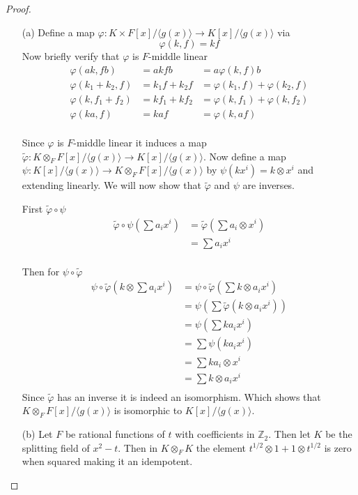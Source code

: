\documentclass[10pt]{article}
\newcommand{\bb}[1]{\mathbb{#1}}
\newcommand{\wt}[1]{\widetilde{#1}}
\theoremstyle{plain}
\theoremstyle{remark}
\begin{document}
\begin{proof}
  \begin{enumerate}
  \item[(a)] Define a map $\varphi:K\times F[x]/\langle g(x)\rangle\rightarrow K[x]/\langle g(x)\rangle$ via
    \[
      \varphi(k,f)= kf
    \]
    Now briefly verify that $\varphi$ is $F$-middle linear
    \begin{align*}
      \varphi(ak,fb) &= akfb &= a\varphi(k,f)b\\
      \varphi(k_1+k_2,f)&= k_1 f+k_2 f &= \varphi(k_1,f)+\varphi(k_2,f)\\
      \varphi(k,f_1+f_2)&= kf_1+kf_2 &= \varphi(k,f_1)+\varphi(k,f_2)\\
      \varphi(ka,f) &= kaf &= \varphi(k,af)\\
    \end{align*}

    Since $\varphi$ is $F$-middle linear it induces a map
    $\wt{\varphi}:K\otimes_F F[x]/\langle g(x)\rangle\rightarrow K[x]/\langle g(x)\rangle$. Now define
    a map $\psi:K[x]/\langle g(x)\rangle\rightarrow K\otimes_F F[x]/\langle g(x)\rangle$ by $\psi(kx^i)=k\otimes x^i$ and
    extending linearly. We will now show that $\wt{\varphi}$ and $\psi$ are inverses.

    First $\wt{\varphi}\circ\psi$
    \begin{align*}
      \wt{\varphi}\circ\psi(\sum a_ix^i) &= \wt{\varphi}(\sum a_i \otimes x^i)\\
                        &= \sum a_i x^i\\
    \end{align*}

    Then for $\psi\circ\wt{\varphi}$
    \begin{align*}
      \psi\circ\wt{\varphi}(k\otimes\sum a_i x^i) &= \psi\circ\wt{\varphi}(\sum k\otimes a_i x^i)\\
                            &= \psi(\sum\wt{\varphi}(k\otimes a_i x^i))\\
                            &= \psi(\sum ka_i x^i)\\
                            &= \sum \psi(ka_ix^i)\\
                            &= \sum ka_i\otimes x^i\\
                            &= \sum k\otimes a_i x^i\\
    \end{align*}
    Since $\wt{\varphi}$ has an inverse it is indeed an isomorphism. Which
    shows that $K\otimes_F F[x]/\langle g(x)\rangle$ is isomorphic to $K[x]/\langle g(x)\rangle$.
  \item[(b)] Let $F$ be rational functions of $t$ with coefficients in $\bb{Z}_2$.
    Then let $K$ be the splitting field of $x^2-t$. Then in $K\otimes_F K$ the
    element $t^{1/2}\otimes 1+1\otimes t^{1/2}$ is zero when squared making it an idempotent.
  \end{enumerate}
\end{proof}
\end{document}
